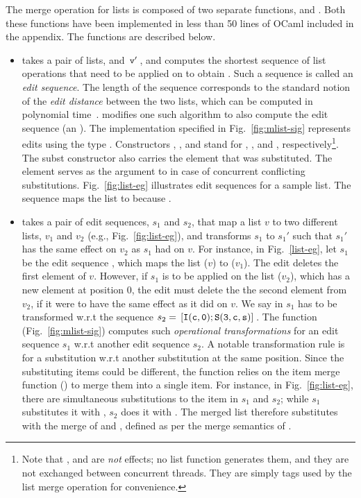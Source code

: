 The merge operation for lists is composed of two separate functions,
 and . Both these functions have been
implemented in less than 50 lines of OCaml included in the appendix.
The functions are described below.
\begin{itemize}
  \item {} takes a pair of lists,  and $\,{\tt v'}\,$, and
  computes the shortest sequence of list operations that need to be
  applied on  to obtain . Such a sequence is called an
  \emph{edit sequence}. The length of the sequence corresponds to the
  standard notion of the \emph{edit distance} between the two lists,
  which can be computed in polynomial time~\cite{wagner-fischer}.
   modifies one such algorithm to also compute the edit
  sequence (an ). The implementation specified in
  Fig.~\ref{fig:mlist-sig} represents edits using the type .
  Constructors , , and  stand for ,
  , and , respectively\footnote{
    Note that ,  and  are \emph{not} effects; no list
    function generates them, and they are not exchanged between
    concurrent threads. They are simply tags used by the list merge
    operation for convenience.
  }. The subst constructor also carries the  element that was
  substituted. The element serves as the  argument to
   in case of concurrent conflicting substitutions.
  Fig.~\ref{fig:list-eg} illustrates edit sequences for a sample list.
  The sequence \C{[I(c,0); S(3,c,s)]} maps the list \C{[a;b;c]} to
  \C{[c;a;b;s]} because .
  \item  {} takes a pair of edit sequences, $s_1$ and
  $s_2$, that map a list $v$ to two different lists, $v_1$ and $v_2$
  (e.g., Fig.~\ref{fig:list-eg}), and transforms $s_1$ to $s_1'$ such
  that $s_1'$ has the same effect on $v_2$ as $s_1$ had on $v$.  For
  instance, in Fig.~\ref{list-eg}, let $s_1$ be the edit sequence
  \C{[D(1); S(1,c,d)]}, which maps the list \C{[a;b;c]} ($v$) to
  \C{[a;d]} ($v_1$). The  edit deletes the first element of $v$.
  However, if $s_1$ is to be applied on the list \C{[c;a;b;s]}
  ($v_2$), which has a new element at position 0, the  edit must
  delete the the second element from $v_2$, if it were to have the
  same effect as it did on $v$. We say  in $s_1$ has to be
  transformed w.r.t the sequence $s_2 = \,{\tt [I(c,0);S(3,c,s)]}\,$.  The
  function  (Fig.~\ref{fig:mlist-sig}) computes such
  \emph{operational transformations} for an edit sequence $s_1$ w.r.t
  another edit sequence $s_2$. A notable transformation rule is for a
  substitution w.r.t another substitution at the same position. Since
  the substituting items could be different, the function relies on
  the item merge function () to merge them into a single
  item. For instance, in Fig.~\ref{fig:list-eg}, there are
  simultaneous substitutions to the item  in $s_1$ and $s_2$;
  while $s_1$ substitutes it with , $s_2$ does it with . The
  merged list therefore substitutes  with the merge of  and
  , defined as per the merge semantics of .
\end{itemize}
